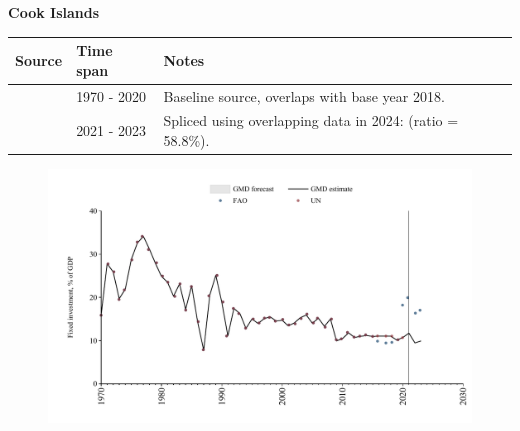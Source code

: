 \documentclass[12pt,a4paper,landscape]{article}
\begin{document}
\begin{adjustbox}{max totalsize={\paperwidth}{\paperheight},center}
\begin{minipage}[t][\textheight][t]{\textwidth}
\vspace*{0.5cm}
{}
\begin{center}
{\Large\bfseries Cook Islands}
\end{center}
\vspace{0.5cm}
\begin{table}[H]
\centering
\small
\begin{tabular}{|l|l|l|}
\hline
\textbf{Source} & \textbf{Time span} & \textbf{Notes} \\
\hline
\rowcolor{white}\cite{UN}& 1970 - 2020 &Baseline source, overlaps with base year 2018.\\
\rowcolor{lightgray}\cite{FAO}& 2021 - 2023 &Spliced using overlapping data in 2024: (ratio = 58.8\%).\\
\hline
\end{tabular}
\end{table}
\begin{figure}[H]
\centering
\includegraphics[width=\textwidth,height=0.6\textheight,keepaspectratio]{graphs/COK_finv_GDP.pdf}
\end{figure}
\end{minipage}
\end{adjustbox}
\end{document}
